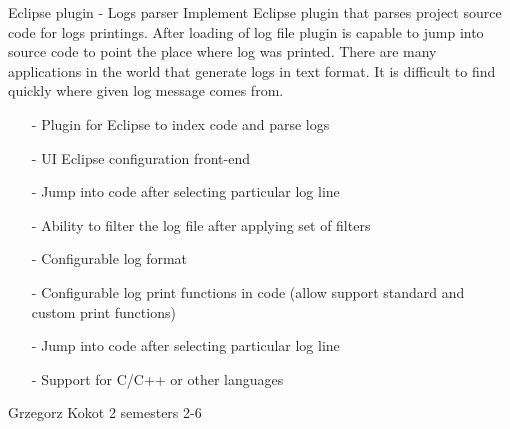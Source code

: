 \begin{project}
{Eclipse plugin - Logs parser}
{
Implement Eclipse plugin that parses project source code for logs printings.
After loading of log file plugin is capable to jump into source code to point
the place where log was printed.
There are many applications in the world that generate logs in text format. It is difficult to find quickly where given log message comes from. 
}
{
 \begin{itemize}
  \item[-] Plugin for Eclipse to index code and parse logs
  \item[-] UI Eclipse configuration front-end
  \item[-] Jump into code after selecting particular log line
  \item[-] Ability to filter the log file after applying set of filters
\end{itemize}
}
{
 \begin{itemize}
  \item[-] Configurable log format
  \item[-] Configurable log print functions in code (allow support standard and custom print functions)
  \item[-] Jump into code after selecting particular log line
  \item[-] Support for C/C++ or other languages
\end{itemize}
}
{Grzegorz Kokot}
{2 semesters}
{2-6}
\end{project}
